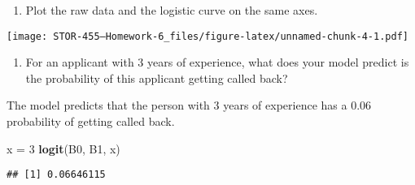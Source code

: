 \documentclass[
]{article}
\newenvironment{Shaded}{\begin{snugshade}}{\end{snugshade}}
\newcommand{\DataTypeTok}[1]{\textcolor[rgb]{0.13,0.29,0.53}{#1}}
\newcommand{\DecValTok}[1]{\textcolor[rgb]{0.00,0.00,0.81}{#1}}
\newcommand{\FloatTok}[1]{\textcolor[rgb]{0.00,0.00,0.81}{#1}}
\newcommand{\KeywordTok}[1]{\textcolor[rgb]{0.13,0.29,0.53}{\textbf{#1}}}
\newcommand{\NormalTok}[1]{#1}
\newcommand{\OperatorTok}[1]{\textcolor[rgb]{0.81,0.36,0.00}{\textbf{#1}}}
\newcommand{\OtherTok}[1]{\textcolor[rgb]{0.56,0.35,0.01}{#1}}
\newcommand{\StringTok}[1]{\textcolor[rgb]{0.31,0.60,0.02}{#1}}
\providecommand{\tightlist}{%
  \setlength{\itemsep}{0pt}\setlength{\parskip}{0pt}}
\begin{document}
\begin{enumerate}
\def\labelenumi{\arabic{enumi})}
\setcounter{enumi}{1}
\tightlist
\item
  Plot the raw data and the logistic curve on the same axes.
\end{enumerate}

\begin{Shaded}
\end{Shaded}

\texttt{[image: STOR-455---Homework-6\_files/figure-latex/unnamed-chunk-4-1.pdf]}

\begin{enumerate}
\def\labelenumi{\arabic{enumi})}
\setcounter{enumi}{2}
\tightlist
\item
  For an applicant with 3 years of experience, what does your model
  predict is the probability of this applicant getting called back?
\end{enumerate}

The model predicts that the person with 3 years of experience has a 0.06
probability of getting called back.

\begin{Shaded}
\begin{Highlighting}[]
\NormalTok{x =}\StringTok{ }\DecValTok{3}
\KeywordTok{logit}\NormalTok{(B0, B1, x)}
\end{Highlighting}
\end{Shaded}

\begin{verbatim}
## [1] 0.06646115
\end{verbatim}
\end{document}
